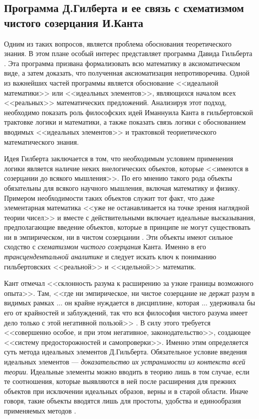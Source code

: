 \documentclass[a4page]{article}
\begin{document}
\subsection{Программа Д.Гилберта и ее связь с схематизмом чистого созерцания И.Канта}
Одним из таких вопросов, является проблема обоснования теоретического знания.
В этом плане особый интерес представляет программа Давида Гильберта \cite{sep-hilbert-program}.
Эта программа призвана формализовать всю математику в аксиоматическом виде,
а затем доказать, что полученная аксиоматизация непротиворечива.
Одной из важнейших частей программы является обоснование <<идеальной математики>> или <<идеальных элементов>>,
являющихся началом всех <<реальных>> математических предложений.
Анализируя этот подход, необходимо показать роль философских идей Иманнуила Канта
в гильбертовской трактовке логики и математики,
а также показать связь логики с обоснованием вводимых <<идеальных элементов>>
и трактовкой теориетического математического знания.

Идея Гилберта заключается в том, что необходимым условием применения логики является
наличие неких внелогических объектов, которые <<имеются в созерцании до всякого мышления>>.
По его мнению такого рода объекты обязательны для всякого научного мышления, включая математику и физику.
Примером необходимости таких объектов служит тот факт,
что даже элементарная математика <<уже не останавливается на точке зрения наглядной теории чисел>>
и вместе с действительными включает идеальные высказывания, предполагающие введение объектов,
которые в принципе не могут существовать ни в эмпирическом, ни в чистом созерцании
\cite{the-foundations-of-geometry}.
Эти объекты имеют сильное сходство с \textit{схематизмом чистого созерцания} Канта.
Именно в его \textit{трансцендентальной аналитике} и следует искать ключ
к пониманию гильбертовских <<реальной>> и <<идельной>> математик.

Кант отмечал <<склонность разума к расширению за узкие границы возможного опыта>>.
Там, <<где ни эмпирическое, ни чистое созерцание не держат разум в видимых рамках ...
он крайне нуждается в дисциплине, которая ... удерживала бы его от крайностей и заблуждений,
так что вся философия чистого разума имеет дело только с этой негативной пользой>>
\cite{iphas-kant-pure-reason}.
В силу этого требуется <<совершенно особое, и при этом негативное, законодательство>>,
создающее <<систему предосторожностей и самопроверки>>.
Именно этим определяется суть метода идеальных элементов Д.Гильберта.
Обязательное условие введения идеальных элементов ---
\textit{доказательство их устранимости из контекста всей теории}.
Идеальные элементы можно вводить в теорию лишь в том случае, если те соотношения,
которые выявляются в ней после расширения для прежних объектов при исключении идеальных образов,
верны и в старой области. Иначе говоря, такие объекты вводятся лишь для простоты,
удобства и единообразия применяемых методов \cite{logic-and-philosophy}.
\end{document}
